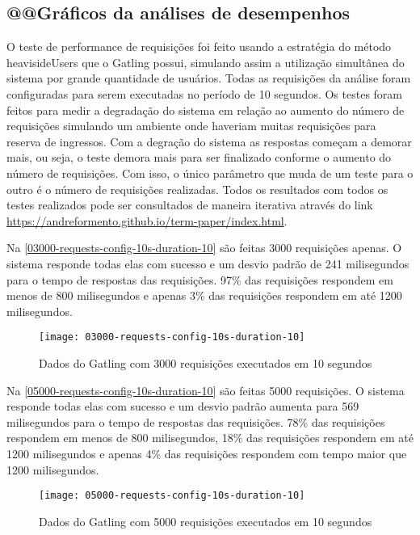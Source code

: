 \subsection{@@Gráficos da análises de desempenhos}

O teste de performance de requisições foi feito usando a
estratégia do método heavisideUsers \cite{gatling-simulation-setup}
que o Gatling possui, simulando assim a utilização simultânea do sistema por
grande quantidade de usuários.
Todas as requisições da análise foram configuradas para serem executadas no período
de 10 segundos.
Os testes foram feitos para medir a degradação do sistema em relação ao aumento do
número de requisições simulando um ambiente onde haveriam muitas requisições para
reserva de ingressos.
Com a degração do sistema as respostas começam a demorar mais, ou seja,
o teste demora mais para ser finalizado conforme o aumento do número de requisições.
Com isso, o único parâmetro que muda de um teste para o outro
é o número de requisições realizadas.
Todos os resultados com todos os testes realizados pode ser consultados de maneira
iterativa através do link \url{https://andreformento.github.io/term-paper/index.html}.

Na \autoref{03000-requests-config-10s-duration-10} são feitas 3000 requisições apenas.
O sistema responde todas elas com sucesso e um desvio padrão de 241 milisegundos
para o tempo de respostas das requisições.
97\% das requisições respondem em menos de 800 milisegundos e apenas 3\% das requisições
respondem em até 1200 milisegundos.

\begin{figure}[h]
  \texttt{[image: 03000-requests-config-10s-duration-10]}
  \caption{Dados do Gatling com 3000 requisições executados em 10 segundos}
  \label{03000-requests-config-10s-duration-10}
\end{figure}

Na \autoref{05000-requests-config-10s-duration-10} são feitas 5000 requisições.
O sistema responde todas elas com sucesso e um desvio padrão aumenta para 569 milisegundos
para o tempo de respostas das requisições.
78\% das requisições respondem em menos de 800 milisegundos, 18\% das requisições
respondem em até 1200 milisegundos e apenas 4\% das requisições
respondem com tempo maior que 1200 milisegundos.

\begin{figure}[h]
  \texttt{[image: 05000-requests-config-10s-duration-10]}
  \caption{Dados do Gatling com 5000 requisições executados em 10 segundos}
  \label{05000-requests-config-10s-duration-10}
\end{figure}
